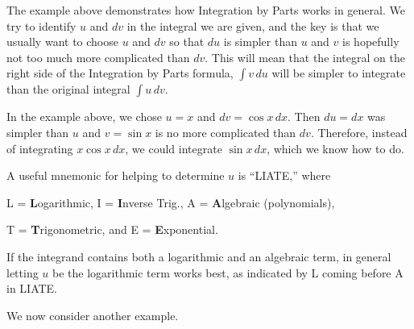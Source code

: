 The example above demonstrates how Integration by Parts works in general.  We try to identify $u$ and $dv$ in the integral we are given, and the key is that we usually want to choose $u$ and $dv$ so that $du$ is simpler than $u$ and $v$ is hopefully not too much more complicated than $dv$.  This will mean that the integral on the right side of the Integration by Parts formula, $\int v\,du$ will be simpler to integrate than the original integral $\int u\,dv$.

In the example above, we chose $u=x$ and $dv=\cos x\,dx$.  Then $du=dx$ was simpler than $u$ and $v=\sin x$ is no more complicated than $dv$.  Therefore, instead of integrating $x\cos x \,dx$, we could integrate $\sin x\,dx$, which we know how to do.

A useful mnemonic for helping to determine $u$ is ``LIATE,'' where 
\begin{center}L = \textbf{L}ogarithmic, I = \textbf{I}nverse Trig., A = \textbf{A}lgebraic (polynomials), 

T = \textbf{T}rigonometric, and E = \textbf{E}xponential.
\end{center}

If the integrand contains both a logarithmic and an algebraic term, in general letting $u$ be the logarithmic term works best, as indicated by L coming before A in LIATE.

We now consider another example.\\

